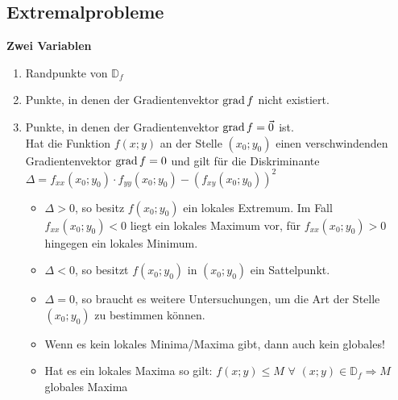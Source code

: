 \subsection{Extremalprobleme}
  \textbf{Zwei Variablen}
  \begin{enumerate}
    \item 
      Randpunkte von $\mathbb{D}_f$
    \item 
      Punkte, in denen der Gradientenvektor $\operatorname{grad} f$ nicht existiert. 
    \item 
      Punkte, in denen der Gradientenvektor $\operatorname{grad} f=\vec{0}$ ist.\\
      Hat die Funktion $f(x;y)$ an der Stelle $(x_0;y_0)$ einen verschwindenden Gradientenvektor $\operatorname{grad} f = 0$ 
      und gilt für die Diskriminante $\Delta = f_{xx}    (x_0;y_0) \cdot f_{yy}(x_0;y_0) -  (f_{xy}(x_0;y_0))^2$
      \begin{itemize}
        \item 
          $\Delta > 0 $, so besitz $f(x_0;y_0)$ ein lokales Extremum. Im Fall $f_{xx}(x_0;y_0) < 0$ liegt ein lokales Maximum vor, 
          für $f_{xx}(x_0;y_0) > 0$ hingegen ein lokales Minimum.
        \item
          $\Delta < 0 $, so besitzt $f(x_0;y_0)$ in $(x_0;y_0)$ ein Sattelpunkt.
        \item 
          $\Delta = 0 $, so braucht es weitere Untersuchungen, um die Art der Stelle $(x_0;y_0)$ zu bestimmen können.
        \item 
          Wenn es kein lokales Minima/Maxima gibt, dann auch kein globales!
        \item
          Hat es ein lokales Maxima so gilt: $f(x;y) \leq M$ $\forall$ $(x;y) \in \mathbb{D}_f \Rightarrow M$ globales Maxima
      \end{itemize}
    \end{enumerate}
  
